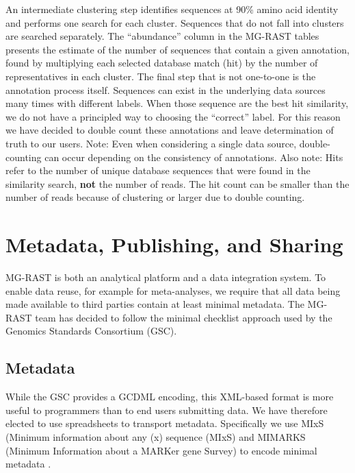\documentclass[12pt,fullpage]{report}
\begin{document}
An intermediate clustering step identifies sequences at 90\% amino acid identity and performs one search for each cluster. Sequences that do not fall into clusters are searched separately. The ``abundance” column in the MG-RAST tables presents the estimate of the number of sequences that contain a given annotation, found by multiplying each selected database match (hit) by the number of representatives in each cluster.
The final step that is not one-to-one is the annotation process itself. Sequences can exist in the underlying data sources many times with different labels. When those sequence are the best hit similarity, we do not have a principled way to choosing the ``correct” label. For this reason we have decided to double count these annotations and leave determination of truth to our users. Note: Even when considering a single data source, double-counting can occur depending on the consistency of annotations.
Also note: Hits refer to the number of unique database sequences that were found in the similarity search, {\bf not} the number of reads. The hit count can be smaller than the number of reads because of clustering or larger due to double counting.



\section{Metadata, Publishing, and Sharing}
MG-RAST is both an analytical platform and a data integration system. To enable data reuse, for example for meta-analyses, we require that all data being made available to third parties contain at least minimal metadata. The MG-RAST team has decided to follow the minimal checklist approach used by the Genomics Standards Consortium (GSC)\cite{GSC}.
\subsection{Metadata}
\label{section:metadata}
While the GSC provides a GCDML \cite{GCDML} encoding, this XML-based format is more useful to programmers than to end users submitting data.
We have therefore elected to use spreadsheets to transport metadata. Specifically we use MIxS (Minimum information about any (x) sequence (MIxS) and MIMARKS (Minimum Information about a MARKer gene Survey) to encode minimal metadata \cite{MIENS}.
\end{document}
